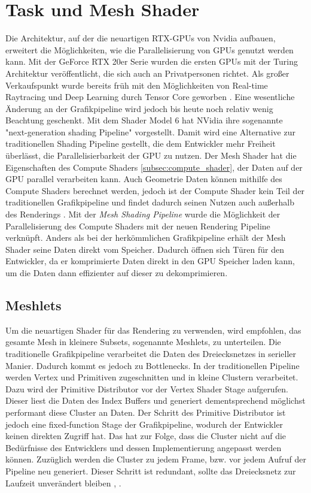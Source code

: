 \section{Task und Mesh Shader}
Die Architektur, auf der die neuartigen RTX-GPUs von Nvidia aufbauen, erweitert die Möglichkeiten, wie die Parallelisierung von GPUs genutzt werden kann.
Mit der GeForce RTX 20er Serie wurden die ersten GPUs mit der Turing Architektur veröffentlicht, die sich auch an Privatpersonen richtet.
Als großer Verkaufspunkt wurde bereits früh mit den Möglichkeiten von Real-time Raytracing und Deep Learning durch Tensor Core geworben \cite{Burgess2020}. 
Eine wesentliche Änderung an der Grafikpipeline wird jedoch bis heute noch relativ wenig Beachtung geschenkt.
Mit dem Shader Model 6 hat NVidia ihre sogenannte "next-generation shading Pipeline" vorgestellt.
Damit wird eine Alternative zur traditionellen Shading Pipeline gestellt, die dem Entwickler mehr Freiheit überlässt, die Parallelisierbarkeit der GPU zu nutzen.
Der Mesh Shader hat die Eigenschaften des Compute Shaders \ref{subsec:compute_shader}, der Daten auf der GPU parallel verarbeiten kann.
Auch Geometrie Daten können mithilfe des Compute Shaders berechnet werden, jedoch ist der Compute Shader kein Teil der traditionellen Grafikpipeline und findet dadurch seinen Nutzen auch außerhalb des Renderings \cite{Ilett2022}.
Mit der \textit{Mesh Shading Pipeline} wurde die Möglichkeit der Parallelisierung des Compute Shaders mit der neuen Rendering Pipeline verknüpft.
Anders als bei der herkömmlichen Grafikpipeline erhält der Mesh Shader seine Daten direkt vom Speicher. 
Dadurch öffnen sich Türen für den Entwickler, da er komprimierte Daten direkt in den GPU Speicher laden kann, um die Daten dann effizienter auf dieser zu dekomprimieren.


\subsection{Meshlets}
\label{subsec:meshlets}
Um die neuartigen Shader für das Rendering zu verwenden, wird empfohlen, das gesamte Mesh in kleinere Subsets, sogenannte Meshlets, zu unterteilen. 
Die traditionelle Grafikpipeline verarbeitet die Daten des Dreiecksnetzes in serieller Manier. 
Dadurch kommt es jedoch zu Bottlenecks.
In der traditionellen Pipeline werden Vertex und Primitiven zugeschnitten und in kleine Clustern verarbeitet.
Dazu wird der Primitive Distributor vor der Vertex Shader Stage aufgerufen.
Dieser liest die Daten des Index Buffers und generiert dementsprechend möglichst performant diese Cluster an Daten.
Der Schritt des Primitive Distributor ist jedoch eine fixed-function Stage der Grafikpipeline, wodurch der Entwickler keinen direkten Zugriff hat.
Das hat zur Folge, dass die Cluster nicht auf die Bedürfnisse des Entwicklers und dessen Implementierung angepasst werden können.
Zuzüglich werden die Cluster zu jedem Frame, bzw. vor jedem Aufruf der Pipeline neu generiert.
Dieser Schritt ist redundant, sollte das Dreiecksnetz zur Laufzeit unverändert bleiben \cite{Carvalho2022}, \cite{Kubisch2018}. \newline

